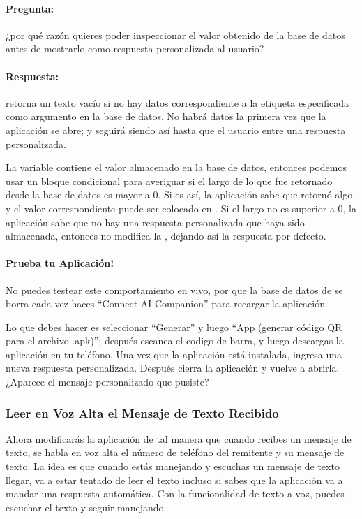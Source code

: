 {{\paragraph{Pregunta:} ¿por qué razón quieres poder inspeccionar el
valor obtenido de la base de datos antes de mostrarlo como respuesta
personalizada al usuario?  {}

\paragraph{Respuesta:}  retorna un texto vacío si no
hay datos correspondiente a la etiqueta especificada como argumento en
la base de datos. No habrá datos la primera vez que la aplicación se
abre; y seguirá siendo así hasta que el usuario entre una respuesta
personalizada.

La variable  contiene el valor almacenado en la
base de datos, entonces podemos usar un bloque condicional para
averiguar si el largo de lo que fue retornado desde la base de datos
es mayor a 0. Si es así, la aplicación sabe que 
retornó algo, y el valor correspondiente puede ser colocado en
. Si el largo no es superior a 0, la
aplicación sabe que no hay una respuesta personalizada que haya sido
almacenada, entonces no modifica la ,
dejando así la respuesta por defecto.

\paragraph{Prueba tu Aplicación!} No puedes testear este
comportamiento en vivo, por que la base de datos de 
se borra cada vez haces ``Connect AI Companion'' para recargar la
aplicación.

Lo que debes hacer es seleccionar ``Generar'' y luego ``App (generar
código QR para el archivo .apk)''; después escanea el codigo de barra,
y luego descargas la aplicación en tu teléfono. Una vez que la
aplicación está instalada, ingresa una nueva respuesta
personalizada. Después cierra la aplicación y vuelve a
abrirla. ¿Aparece el mensaje personalizado que pusiste?

\subsubsection*{Leer en Voz Alta el Mensaje de Texto Recibido}

Ahora modificarás la aplicación de tal manera que cuando recibes un
mensaje de texto, se habla en voz alta el número de teléfono del
remitente y su mensaje de texto. La idea es que cuando estás manejando
y escuchas un mensaje de texto llegar, va a estar tentado de leer el
texto incluso si sabes que la aplicación va a mandar una respuesta
automática. Con la funcionalidad de texto-a-voz, puedes escuchar el
texto y seguir manejando.

}}
